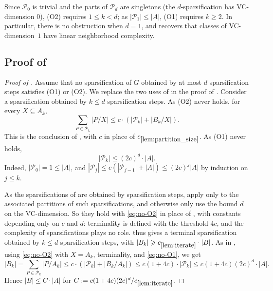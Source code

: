 \documentclass[11pt]{article}
\theoremstyle{definition}
\newcommand{\inducedSS}[2]{#1/#2}%
\renewcommand{\le}{\leqslant}
\renewcommand{\ge}{\geqslant}
\newcommand{\Pp}{\mathcal{P}}
\begin{document}
Since $\Pp_0$ is trivial and the parts of $\Pp_d$ are singletons (the $d$-sparsification has VC-dimension $0$), (O2) requires $1 \le k < d$; as $|\Pp_1| \le |A|$, (O1) requires $k \ge 2$.
In particular, there is no obstruction when $d = 1$, and  recovers that classes of VC-dimension~$1$ have linear neighborhood complexity.

\subsection{Proof of }

\begin{proof}[Proof of ]
Assume that no sparsification of $G$ obtained by at most $d$ sparsification steps satisfies (O1) or (O2).
We replace the two uses of  in the proof of .
Consider a sparsification obtained by $k \le d$ sparsification steps.
As (O2) never holds, for every $X \subseteq A_k$,
\begin{equation}\label{eq:no-O2}
  \sum_{P \in \Pp_k} |\inducedSS{P}{X}| \le c \cdot \left(|\Pp_k| + |\inducedSS{B_k}{X}|\right).
\end{equation}
This is the conclusion of , with $c$ in place of $c_{\ref{lem:partition_size}}$.
As (O1) never holds,
\begin{equation}\label{eq:no-O1}
  |\Pp_k| \le (2c)^d \cdot |A|.
\end{equation}
Indeed, $|\Pp_0| = 1 \le |A|$, and $|\Pp_j| \le c(|\Pp_{j-1}| + |A|) \le (2c)^j |A|$ by induction on $j \le k$.

As the sparsifications of  are obtained by sparsification steps,  apply  only to the associated partitions of such sparsifications, and otherwise only use the bound $d$ on the VC-dimension.
So they hold with \eqref{eq:no-O2} in place of , with constants depending only on $c$ and $d$: terminality is defined with the threshold $4c$, and the complexity of sparsifications plays no role.
 thus gives a terminal sparsification obtained by $k \le d$ sparsification steps, with $|B_k| \ge c_{\ref{lem:iterate}} \cdot |B|$.
As in , using \eqref{eq:no-O2} with $X = A_k$, terminality, and \eqref{eq:no-O1}, we get
\[
  |B_k| = \sum_{P \in \Pp_k} |\inducedSS{P}{A_k}| \le c \cdot \left(|\Pp_k| + |\inducedSS{B_k}{A_k}|\right) \le c (1 + 4c) \cdot |\Pp_k| \le c (1 + 4c) (2c)^d \cdot |A|.
\]
Hence $|B| \le C \cdot |A|$ for $C := c(1 + 4c) (2c)^d / c_{\ref{lem:iterate}}$.
\end{proof}
\end{document}
